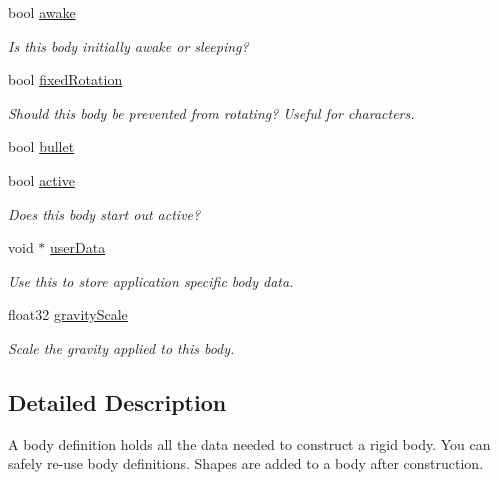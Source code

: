 \begin{DoxyCompactItemize}
bool \hyperlink{structb2BodyDef_a17a8102638aac41e7ab94278651a45bd}{awake}
\begin{DoxyCompactList}\small\item\em Is this body initially awake or sleeping? \end{DoxyCompactList}\item 
\mbox{\label{structb2BodyDef_a273a51c57440a8884de5939d76b6e3ea}} 
bool \hyperlink{structb2BodyDef_a273a51c57440a8884de5939d76b6e3ea}{fixed\+Rotation}
\begin{DoxyCompactList}\small\item\em Should this body be prevented from rotating? Useful for characters. \end{DoxyCompactList}\item 
bool \hyperlink{structb2BodyDef_a7c0047c9a98a1d20614eeddcdbce7586}{bullet}
\item 
\mbox{\label{structb2BodyDef_adf6f3e9a9e124e080c68bc0edeb170df}} 
bool \hyperlink{structb2BodyDef_adf6f3e9a9e124e080c68bc0edeb170df}{active}
\begin{DoxyCompactList}\small\item\em Does this body start out active? \end{DoxyCompactList}\item 
\mbox{\label{structb2BodyDef_a8d18663d70fea3474fbb3bde36aa7196}} 
void $\ast$ \hyperlink{structb2BodyDef_a8d18663d70fea3474fbb3bde36aa7196}{user\+Data}
\begin{DoxyCompactList}\small\item\em Use this to store application specific body data. \end{DoxyCompactList}\item 
\mbox{\label{structb2BodyDef_aadea3fa173ed1014739ec8b023de4336}} 
float32 \hyperlink{structb2BodyDef_aadea3fa173ed1014739ec8b023de4336}{gravity\+Scale}
\begin{DoxyCompactList}\small\item\em Scale the gravity applied to this body. \end{DoxyCompactList}\end{DoxyCompactItemize}


\subsection{Detailed Description}
A body definition holds all the data needed to construct a rigid body. You can safely re-\/use body definitions. Shapes are added to a body after construction. 

